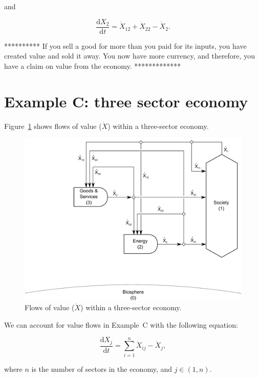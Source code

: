 \noindent and

\begin{equation}
	\frac{\mathrm{d}X_{2}}{\mathrm{d}t}
	= \dot{X}_{12}
	+ \dot{X}_{22}
	- \dot{X}_{2}.
\end{equation}

**********
If you sell a good for more than you paid for its inputs, 
you have created value and sold it away. 
You now have more currency, and therefore, 
you have a claim on value from the economy.
*************




\section{Example C: three sector economy}

Figure~\ref{fig:C_value} shows flows of value ($\dot{X}$) 
within a three-sector economy. 

\begin{figure}[h!]
\centering
\includegraphics[width=0.8\linewidth]{Part_3/Chapter_Values/images/3_sector_value.pdf}
\caption{Flows of value ($\dot{X}$) within a three-sector economy.}
\label{fig:C_value}
\end{figure}

We can account for value flows in Example~C with the following equation:

\begin{equation}
	\frac{\mathrm{d}X_{j}}{\mathrm{d}t}
	= \sum\limits_{i=1}^{n} \dot{X}_{ij}
	- \dot{X}_{j},
\end{equation}

\noindent where $n$ is the number of sectors in the economy, and $j \in (1, n)$.


